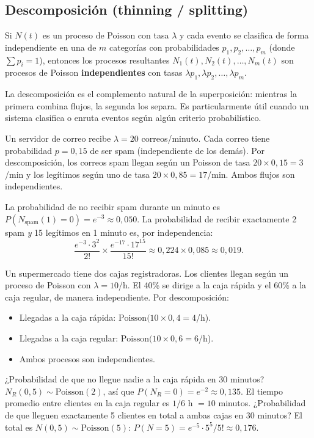 \documentclass[11pt, letterpaper]{article}
\begin{document}
\subsection{Descomposición (thinning / splitting)}

\begin{teorema}[Descomposición]
Si $N(t)$ es un proceso de Poisson con tasa $\lambda$ y cada evento se clasifica de forma independiente en una de $m$ categorías con probabilidades $p_1, p_2, \ldots, p_m$ (donde $\sum p_i = 1$), entonces los procesos resultantes $N_1(t), N_2(t), \ldots, N_m(t)$ son procesos de Poisson \textbf{independientes} con tasas $\lambda p_1, \lambda p_2, \ldots, \lambda p_m$.
\end{teorema}

La descomposición es el complemento natural de la superposición: mientras la primera combina flujos, la segunda los separa. Es particularmente útil cuando un sistema clasifica o enruta eventos según algún criterio probabilístico.

\begin{ejemplo}
Un servidor de correo recibe $\lambda = 20$ correos/minuto. Cada correo tiene probabilidad $p = 0{,}15$ de ser spam (independiente de los demás). Por descomposición, los correos spam llegan según un Poisson de tasa $20 \times 0{,}15 = 3$/min y los legítimos según uno de tasa $20 \times 0{,}85 = 17$/min. Ambos flujos son independientes.

La probabilidad de no recibir spam durante un minuto es $P(N_{\text{spam}}(1)=0) = e^{-3} \approx 0{,}050$. La probabilidad de recibir exactamente 2 spam \emph{y} 15 legítimos en 1 minuto es, por independencia:
\[
\frac{e^{-3}\cdot 3^2}{2!} \times \frac{e^{-17}\cdot 17^{15}}{15!} \approx 0{,}224 \times 0{,}085 \approx 0{,}019.
\]
\end{ejemplo}

\begin{ejemplo}
Un supermercado tiene dos cajas registradoras. Los clientes llegan según un proceso de Poisson con $\lambda = 10$/h. El 40\% se dirige a la caja rápida y el 60\% a la caja regular, de manera independiente. Por descomposición:
\begin{itemize}[nosep]
    \item Llegadas a la caja rápida: $\text{Poisson}(10 \times 0{,}4 = 4$/h).
    \item Llegadas a la caja regular: $\text{Poisson}(10 \times 0{,}6 = 6$/h).
    \item Ambos procesos son independientes.
\end{itemize}

¿Probabilidad de que no llegue nadie a la caja rápida en 30 minutos? $N_R(0{,}5) \sim \text{Poisson}(2)$, así que $P(N_R = 0) = e^{-2} \approx 0{,}135$. El tiempo promedio entre clientes en la caja regular es $1/6$ h $= 10$ minutos. ¿Probabilidad de que lleguen exactamente 5 clientes en total a ambas cajas en 30 minutos? El total es $N(0{,}5) \sim \text{Poisson}(5)$: $P(N=5) = e^{-5}\cdot 5^5/5! \approx 0{,}176$.
\end{ejemplo}
\end{document}
